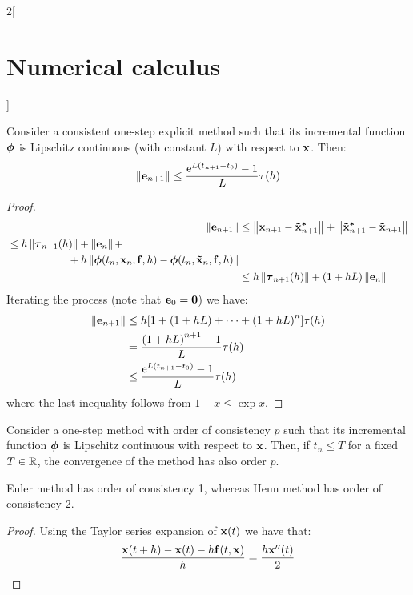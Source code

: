 \documentclass[../../../main_math.tex]{subfiles}
\begin{document}
\begin{multicols}{2}[\section{Numerical calculus}]
\begin{remark}
  \end{remark}
  \begin{theorem}\label{NC:errorLipschitz}
    Consider a consistent one-step explicit method such that its incremental function $\boldsymbol{\mathrm{\phi}}$ is Lipschitz continuous (with constant $L$) with respect to $\boldsymbol{\mathrm{x}}$. Then:
    $$\left\|\boldsymbol{\mathrm{e}}_{n+1}\right\|\leq \frac{\mathrm{e}^{L(t_{n+1}-t_0)}-1}{L}\tau(h)$$
  \end{theorem}
  \begin{proof}
    \begin{align*}
      \left\|\boldsymbol{\mathrm{e}}_{n+1}\right\| & \leq \left\|\boldsymbol{\mathrm{x}}_{n+1}-\boldsymbol{\mathrm{\tilde{x}}}_{n+1}^{\boldsymbol{\mathrm{*}}}\right\|+\left\|\boldsymbol{\mathrm{\tilde{x}}}_{n+1}^{\boldsymbol{\mathrm{*}}}-\boldsymbol{\mathrm{\tilde{x}}}_{n+1}\right\|                  \\
      \begin{split}
        & \leq h\left\|\boldsymbol{\mathrm{\tau}}_{n+1}(h)\right\|+\left\|\boldsymbol{\mathrm{e}}_n\right\|+\\&\hspace{2cm}+h\left\|\boldsymbol{\mathrm{\phi}}(t_n,\boldsymbol{\mathrm{x}}_{n},\boldsymbol{\mathrm{f}},h)-\boldsymbol{\mathrm{\phi}}(t_n,\boldsymbol{\mathrm{\tilde{x}}}_{n},\boldsymbol{\mathrm{{f}}},h)\right\|
      \end{split} \\
                          & \leq h\left\|\boldsymbol{\mathrm{\tau}}_{n+1}(h)\right\|+(1+hL)\left\|\boldsymbol{\mathrm{e}}_n\right\|
    \end{align*}
    Iterating the process (note that $\boldsymbol{\mathrm{e}}_0=\boldsymbol{\mathrm{0}}$) we have:
    \begin{align*}
      \left\|\boldsymbol{\mathrm{e}}_{n+1}\right\| & \leq h[1+(1+hL)+\cdots+{(1+hL)}^n]\tau(h)    \\
                          & = \frac{{(1+hL)}^{n+1}-1}{L}\tau(h)          \\
                          & \leq \frac{\mathrm{e}^{L(t_{n+1}-t_0)}-1}{L}\tau(h)
    \end{align*}
    where the last inequality follows from $1+x\leq\exp{x}$.
  \end{proof}
  \begin{corollary}
    Consider a one-step method with order of consistency $p$ such that its incremental function $\boldsymbol{\mathrm{\phi}}$ is Lipschitz continuous with respect to $\boldsymbol{\mathrm{x}}$. Then, if $t_n\leq T$ for a fixed $T\in\mathbb{R}$, the convergence of the method has also order $p$.
  \end{corollary}
  \begin{lemma}
    Euler method has order of consistency 1, whereas Heun method has order of consistency 2.
  \end{lemma}
  \begin{proof}
    Using the Taylor series expansion of $\boldsymbol{\mathrm{x}}(t)$ we have that:
    $$\frac{\boldsymbol{\mathrm{x}}(t+h)-\boldsymbol{\mathrm{x}}(t)-h\boldsymbol{\mathrm{f}}(t,\boldsymbol{\mathrm{x}})}{h}=\frac{h\boldsymbol{\mathrm{x}}''(t)}{2}$$

\end{proof}
\end{multicols}
\end{document}

